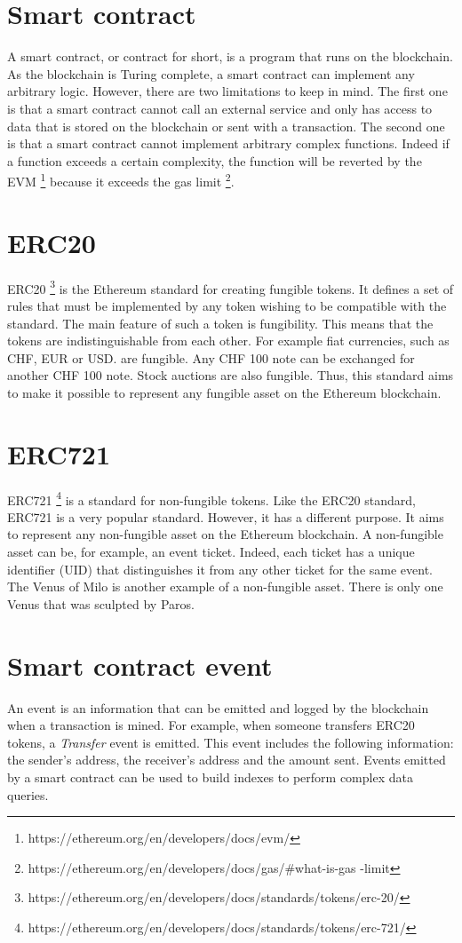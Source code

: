 \documentclass[a4paper,11pt,oneside]{report}
\begin{document}
\section{Smart contract}
A smart contract, or contract for short, is a program that runs on the blockchain. As the blockchain is Turing complete, a smart contract can implement any arbitrary logic. However, there are two limitations to keep in mind. The first one is that a smart contract cannot call an external service and only has access to data that is stored on the blockchain or sent with a transaction. The second one is that a smart contract cannot implement arbitrary complex functions. Indeed if a function exceeds a certain complexity, the function will be reverted by the EVM \footnote{https://ethereum.org/en/developers/docs/evm/} because it exceeds the gas limit \footnote{https://ethereum.org/en/developers/docs/gas/#what-is-gas -limit }.

\section{ERC20}
ERC20 \footnote{https://ethereum.org/en/developers/docs/standards/tokens/erc-20/} is the Ethereum standard for creating fungible tokens. It defines a set of rules that must be implemented by any token wishing to be compatible with the standard. The main feature of such a token is fungibility. This means that the tokens are indistinguishable from each other. For example fiat currencies, such as CHF, EUR or USD. are fungible. Any CHF 100 note can be exchanged for another CHF 100 note. Stock auctions are also fungible. Thus, this standard aims to make it possible to represent any fungible asset on the Ethereum blockchain. 

\section{ERC721}
ERC721 \footnote{https://ethereum.org/en/developers/docs/standards/tokens/erc-721/} is a standard for non-fungible tokens. Like the ERC20 standard, ERC721 is a very popular standard. However, it has a different purpose. It aims to represent any non-fungible asset on the Ethereum blockchain. A non-fungible asset can be, for example, an event ticket. Indeed, each ticket has a unique identifier (UID) that distinguishes it from any other ticket for the same event. The Venus of Milo is another example of a non-fungible asset. There is only one Venus that was sculpted by Paros.

\section{Smart contract event}
An event is an information that can be emitted and logged by the blockchain when a transaction is mined. For example, when someone transfers ERC20 tokens, a \textit{Transfer} event is emitted. This event includes the following information: the sender's address, the receiver's address and the amount sent. Events emitted by a smart contract can be used to build indexes to perform complex data queries.
\end{document}
